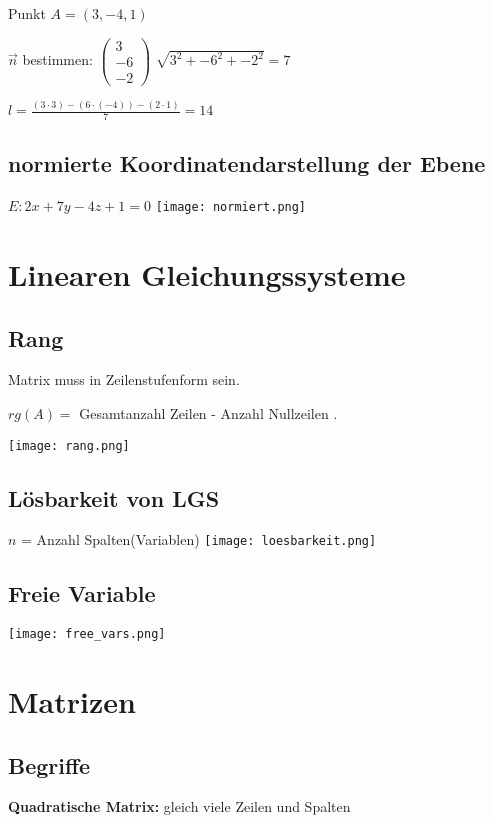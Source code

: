 \begin{multicols*}{3}
    {Punkt $A = (3,-4,1)$}


    { $\vec{n}$ bestimmen: $\begin{pmatrix}
                3  \\
                -6 \\
                -2
            \end{pmatrix}$ $\sqrt{3^2+-6^2+-2^2} = 7$}

    { $l = \frac{(3 \cdot 3) -(6 \cdot (-4)) - (2 \cdot 1)}{7} = 14$}
    \WhiteSpace


    \subsection{  normierte Koordinatendarstellung der Ebene}
    {$E: 2x + 7y - 4z + 1 = 0$}
    \texttt{[image: normiert.png]}

    \vfill\null
    \columnbreak
    \section{Linearen Gleichungssysteme}
    \WhiteSpace
    \subsection{Rang}
    {Matrix muss in Zeilenstufenform sein.}

    {$rg(A) = $ Gesamtanzahl Zeilen - Anzahl Nullzeilen .}

    \texttt{[image: rang.png]}

    \subsection{Lösbarkeit von LGS}
    {$ n $ = Anzahl Spalten(Variablen)}
    \texttt{[image: loesbarkeit.png]}
    \subsection{Freie Variable}

    \texttt{[image: free\_vars.png]}

    \vfill\null
    \columnbreak
    \section{Matrizen}
    \subsection{Begriffe}
    {\textbf{Quadratische Matrix:} gleich viele Zeilen und Spalten}


\end{multicols*}

